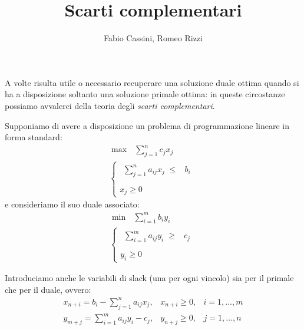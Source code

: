 \documentclass{article}[10pt]
\title{Scarti complementari}
\author{Fabio Cassini, Romeo Rizzi}
\theoremstyle{theorem}
\theoremstyle{definition}
\theoremstyle{definition}
\theoremstyle{definition}
\begin{document}
	\maketitle
	A volte risulta utile o necessario recuperare una soluzione duale ottima quando si ha a disposizione soltanto una soluzione primale ottima: in queste circostanze possiamo avvalerci della teoria degli \emph{scarti complementari}.
	
	Supponiamo di avere a disposizione un problema di programmazione lineare in forma standard:
	\[
	\begin{array}{l}
	\max \mbox{\ }\sum_{j=1}^{n}c_jx_j\\
	\left\{
	\begin{array}{l}
	\begin{array}{rr}
	\sum_{j=1}^{n}a_{ij}x_j \;\leq & b_i \\
	\end{array} \\
	x_j  \geq 0    
	\end{array}
	\right.
	\end{array}
	\]
	e consideriamo il suo duale associato:
	\[
	\begin{array}{l}
	\min \mbox{\ }\sum_{i=1}^{m}b_iy_i\\
	\left\{
	\begin{array}{l}
	\begin{array}{rr}
	\sum_{i=1}^{m}a_{ij}y_i \;\geq & c_j \\
	\end{array} \\
	y_i  \geq 0    
	\end{array}
	\right.
	\end{array}
	\]	
	
	Introduciamo anche le variabili di slack (una per ogni vincolo) sia per il primale che per il duale, ovvero:
	\begin{eqnarray}
	x_{n+i}=b_i-\sum_{j=1}^{n}a_{ij}x_j, & x_{n+i}\geq 0, & i=1,\ldots,m \label{pr} \\
	y_{m+j}=\sum_{i=1}^{m}a_{ij}y_i - c_j, & y_{n+j} \geq 0, & j=1,\ldots,n \label{sc}
	\end{eqnarray}
	
\end{document}

